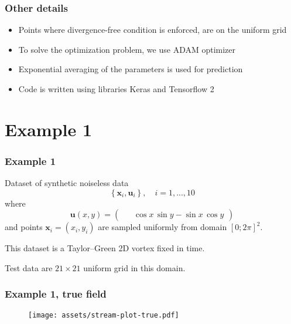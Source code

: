 \documentclass{beamer}
\def\\{}%
\renewcommand{\vec}[1]{\boldsymbol{#1}}
\begin{document}
\begin{frame}
\frametitle{Other details}

\begin{itemize}
    \item Points where divergence-free condition is enforced, are on the uniform grid
    \item To solve the optimization problem, we use ADAM optimizer
    \item Exponential averaging of the parameters is used for prediction
    \item Code is written using libraries Keras and Tensorflow 2
\end{itemize}

\end{frame}

\section{Example 1}

\begin{frame}
\frametitle{Example 1}

Dataset of synthetic noiseless data
\[
    \left\{\vec{x}_i, \vec{u}_i\right\}, \quad i = 1, ..., 10
\]
where
\[
    \vec u(x, y) = \begin{pmatrix}
        \phantom{-} \cos x \, \sin y\\
        -\sin x \, \cos y
    \end{pmatrix}
\]
and points $\vec x_i = (x_i, y_i)$ are sampled uniformly from domain $[0; 2\pi]^2$.

This dataset is a Taylor--Green 2D vortex fixed in time.

Test data are $21\times21$ uniform grid in this domain.
\end{frame}

\begin{frame}
\frametitle{Example 1, true field}

\vspace{1cm}
\begin{figure}
\centering
\texttt{[image: assets/stream-plot-true.pdf]}
\end{figure}
\end{frame}
\end{document}
